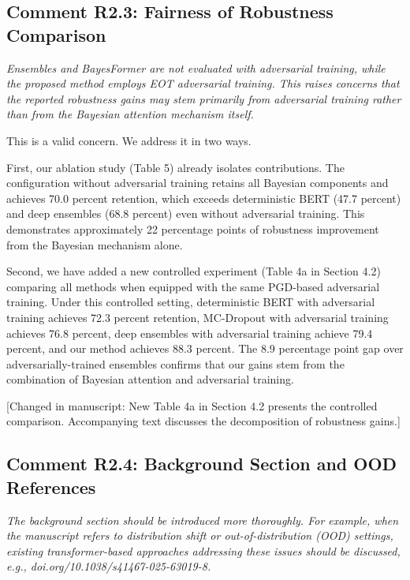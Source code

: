 \documentclass[12pt,a4paper]{article}
\newcommand{\reviewertext}[1]{\textcolor{reviewercolor}{\textit{#1}}}
\newcommand{\response}[1]{\textcolor{responsecolor}{#1}}
\newcommand{\changed}[1]{\textcolor{changecolor}{[Changed in manuscript: #1]}}
\begin{document}
\bigskip

\subsection*{Comment R2.3: Fairness of Robustness Comparison}

\reviewertext{Ensembles and BayesFormer are not evaluated with adversarial training, while the proposed method employs EOT adversarial training. This raises concerns that the reported robustness gains may stem primarily from adversarial training rather than from the Bayesian attention mechanism itself.}

\bigskip

\response{This is a valid concern. We address it in two ways.}

\response{First, our ablation study (Table 5) already isolates contributions. The configuration without adversarial training retains all Bayesian components and achieves 70.0 percent retention, which exceeds deterministic BERT (47.7 percent) and deep ensembles (68.8 percent) even without adversarial training. This demonstrates approximately 22 percentage points of robustness improvement from the Bayesian mechanism alone.}

\response{Second, we have added a new controlled experiment (Table 4a in Section 4.2) comparing all methods when equipped with the same PGD-based adversarial training. Under this controlled setting, deterministic BERT with adversarial training achieves 72.3 percent retention, MC-Dropout with adversarial training achieves 76.8 percent, deep ensembles with adversarial training achieve 79.4 percent, and our method achieves 88.3 percent. The 8.9 percentage point gap over adversarially-trained ensembles confirms that our gains stem from the combination of Bayesian attention and adversarial training.}

\changed{New Table 4a in Section 4.2 presents the controlled comparison. Accompanying text discusses the decomposition of robustness gains.}

\bigskip

\subsection*{Comment R2.4: Background Section and OOD References}

\reviewertext{The background section should be introduced more thoroughly. For example, when the manuscript refers to distribution shift or out-of-distribution (OOD) settings, existing transformer-based approaches addressing these issues should be discussed, e.g., doi.org/10.1038/s41467-025-63019-8.}
\end{document}
